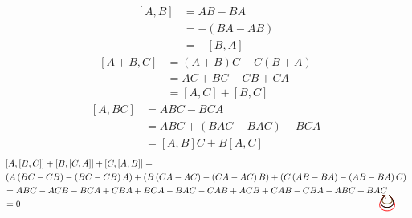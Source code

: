 \documentclass{article}
\newcommand{\tikzmark}[1]{\tikz[overlay,remember picture] \node (#1) {};}
\begin{document}
\begin{align*}
   \left[ A,B \right] &= AB-BA \\
                      &= - (BA - AB) \\
                      &= - \left[ B,A \right]
\end{align*}
\begin{align*}
   \left[ A+B,C \right] &= (A + B)C - C(B+A) \\
                        &= AC + BC - CB + CA \\
                        &= [A,C]+[B,C]
\end{align*}
\begin{align*}
   \left[ A,BC \right] &= ABC - BCA \\
                       &= ABC + ( BAC - BAC ) - BCA \\
                       &= \left[ A,B\right]C + B\left[A,C \right]
\end{align*}
\begin{align*}
   &\left[ A,\left[ B,C \right] \right] + \left[ B,\left[ C,A \right] \right] +
   \left[ C,\left[ A,B \right] \right]
   =  \\
   &\left( A \left( BC - CB \right) - \left( BC - CB \right) A \right)
   + \left( B \left( CA - AC \right) - \left( CA-AC \right)B \right)
   + \left( C \left( AB - BA \right) - \left( AB-BA \right)C \right) \\
   &= A\tikzmark{abc1}BC -
   A\tikzmark{acb1}CB -
   B\tikzmark{bca1}CA +
   C\tikzmark{cba1}BA +
   BC\tikzmark{bca2}A -
   B\tikzmark{bac1}AC -
   C\tikzmark{cab1}AB +
   AC\tikzmark{acb2}B +
   CA\tikzmark{cab2}B -
   CB\tikzmark{cba2}A -
   AB\tikzmark{abc2}C +
   BA\tikzmark{bac2}C
   \begin{tikzpicture}[overlay, remember picture, out=315, in=225]
      \draw[->,shorten >= 3pt, shorten <= 3pt,red,thick,distance=1.25cm] (abc1.center) to (abc2.center);
      \draw[->,shorten >= 3pt, shorten <= 3pt,green,thick,distance=.75cm] (bca1.center) to (bca2.center);
      \draw[->,shorten >= 3pt, shorten <= 3pt,blue,thick,distance=1cm] (cba1.center) to (cba2.center);
      \draw[->,shorten >= 3pt, shorten <= 3pt,purple,thick,distance=.75cm] (cab1.center) to (cab2.center);
      \draw[->,shorten >= 3pt, shorten <= 3pt,orange,thick,distance=1cm] (acb1.center) to (acb2.center);
      \draw[->,shorten >= 3pt, shorten <= 3pt,black,thick,distance=1cm] (bac1.center) to (bac2.center);
   \end{tikzpicture} \\
   &= 0
\end{align*}
\end{document}
